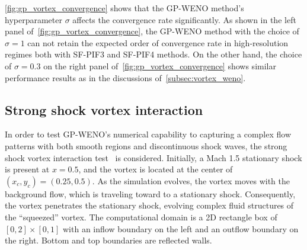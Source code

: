 \cref{fig:gp_vortex_convergence} shows that the GP-WENO method's hyperparameter \( \sigma \)
affects the convergence rate significantly.
As shown in the left panel of~\cref{fig:gp_vortex_convergence},
the GP-WENO method with the choice of \( \sigma = 1 \) can not retain
the expected order of convergence rate
in high-resolution regimes
both with SF-PIF3 and SF-PIF4 methods.
On the other hand, the choice of \( \sigma = 0.3 \) on the right panel of~\cref{fig:gp_vortex_convergence}
shows similar performance results as in the discussions of~\cref{subsec:vortex_weno}.


\subsection{Strong shock vortex interaction}\label{subsec:shock_vortex}

In order to test GP-WENO's numerical capability to capturing
a complex flow patterns with both smooth regions and discontinuous shock waves,
the strong shock vortex interaction test~\cite{cheng2019two,galbraith5th} is considered.
Initially, a Mach 1.5 stationary shock is present at \( x = 0.5 \),
and the vortex is located at the center of \( (x_{c}, y_{c}) = (0.25, 0.5) \).
As the simulation evolves, the vortex moves with the background flow,
which is traveling toward to a stationary shock.
Consequently, the vortex penetrates the stationary shock,
evolving complex fluid structures of the ``squeezed'' vortex.
The computational domain is a 2D rectangle box of \( [0,2]\times[0,1] \)
with an inflow boundary on the left and an outflow boundary on the right.
Bottom and top boundaries are reflected walls.

